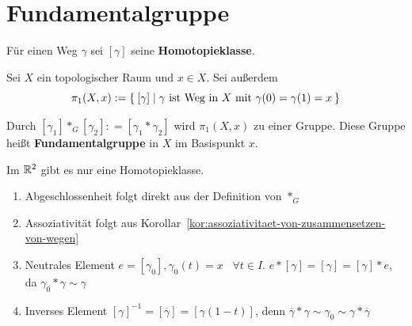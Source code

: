 \section{Fundamentalgruppe}
Für einen Weg $\gamma$ sei $[\gamma]$ seine \textbf{Homotopieklasse}.

\begin{definition}
    Sei $X$ ein topologischer Raum und $x \in X$. Sei außerdem
    \[\pi_1(X,x) := \Set{[\gamma] | \gamma \text{ ist Weg in } X \text{ mit } \gamma(0) = \gamma(1) = x}\]

    Durch $[\gamma_1] *_G [\gamma_2] : = [\gamma_1 * \gamma_2]$ wird
    $\pi_1(X,x)$ zu einer Gruppe. Diese Gruppe heißt \textbf{Fundamentalgruppe}
    in $X$ im Basispunkt $x$.
\end{definition}

\begin{bemerkung}
    Im $\mathbb{R}^2$ gibt es nur eine Homotopieklasse.
\end{bemerkung}

\begin{beweis}\leavevmode
    \begin{enumerate}[label=\alph*)]
        \item Abgeschlossenheit folgt direkt aus der Definition von $*_G$
        \item Assoziativität folgt aus Korollar~\ref{kor:assoziativitaet-von-zusammensetzen-von-wegen}
        \item Neutrales Element $e = [\gamma_0], \gamma_0(t) = x \;\;\; \forall t \in I$.
              $e * [\gamma] = [\gamma] = [\gamma] * e$, da $\gamma_0 * \gamma \sim \gamma$
        \item Inverses Element  $[\gamma]^{-1} = [\overline{\gamma}] = [\gamma(1-t)]$, 
              denn $\overline{\gamma} * \gamma \sim \gamma_0 \sim \gamma * \overline{\gamma}$
    \end{enumerate}
\end{beweis}

